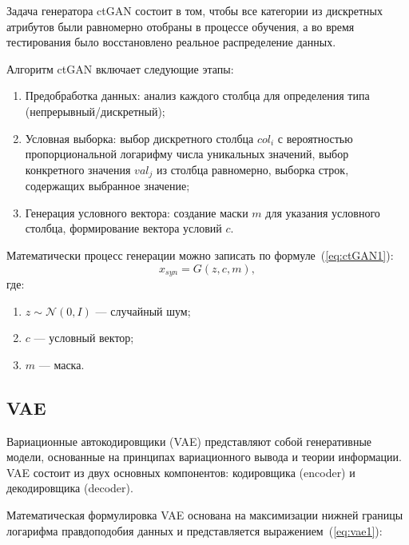 Задача генератора ctGAN состоит в том, чтобы все категории из дискретных атрибутов были равномерно отобраны в процессе обучения, а во время тестирования было восстановлено реальное распределение данных.~\cite{kim2024ctgan}

\newpage
Алгоритм ctGAN включает следующие этапы:
\begin{enumerate}
	\item Предобработка данных: анализ каждого столбца для определения типа (непрерывный/дискретный);

	\item Условная выборка: выбор дискретного столбца $col_i$ с вероятностью пропорциональной логарифму числа уникальных значений, выбор конкретного значения $val_j$ из столбца равномерно, выборка строк, содержащих выбранное значение;

	\item Генерация условного вектора: создание маски $m$ для указания условного столбца, формирование вектора условий $c$.
\end{enumerate}
Математически процесс генерации можно записать по формуле~(\ref{eq:ctGAN1}):
\begin{equation}\label{eq:ctGAN1}
    {x}_{syn} = G({z}, {c}, {m}),
\end{equation}
где:
\begin{enumerate}[label*=---]
	\item ${z} \sim \mathcal{N}(0, {I})$ --- случайный шум;
	\item $c$ --- условный вектор;
	\item $m$ --- маска.
\end{enumerate}


\subsection{VAE}

Вариационные автокодировщики (VAE) представляют собой генеративные модели, основанные на принципах вариационного вывода и теории информации. VAE состоит из двух основных компонентов: кодировщика (encoder) и декодировщика (decoder).~\cite{vae}

Математическая формулировка VAE основана на максимизации нижней границы логарифма правдоподобия данных и представляется выражением~(\ref{eq:vae1}):

